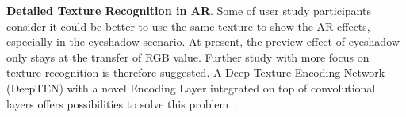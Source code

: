 \textbf{Detailed Texture Recognition in AR}. Some of user study participants
consider it could be better to use the same texture to show the AR effects,
especially in the eyeshadow scenario.
At present, the preview effect of eyeshadow only stays at the transfer of RGB value.
Further study with more focus on texture recognition is therefore suggested.
A Deep Texture Encoding Network (DeepTEN) with a novel Encoding Layer
integrated on top of convolutional layers offers possibilities to solve this problem~\cite{Zhang2017}.


